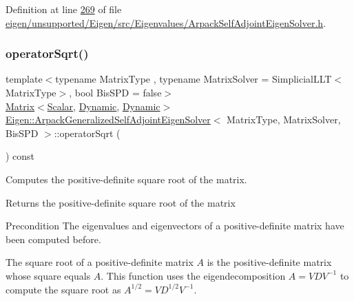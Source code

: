 Definition at line \hyperlink{eigen_2unsupported_2_eigen_2src_2_eigenvalues_2_arpack_self_adjoint_eigen_solver_8h_source_l00269}{269} of file \hyperlink{eigen_2unsupported_2_eigen_2src_2_eigenvalues_2_arpack_self_adjoint_eigen_solver_8h_source}{eigen/unsupported/\+Eigen/src/\+Eigenvalues/\+Arpack\+Self\+Adjoint\+Eigen\+Solver.\+h}.

\mbox{\label{class_eigen_1_1_arpack_generalized_self_adjoint_eigen_solver_a7522aad061ebccc065b254c0bc67d3b0}} 
\subsubsection{\texorpdfstring{operator\+Sqrt()}{operatorSqrt()}\hspace{0.1cm}{\footnotesize\ttfamily [2/2]}}
{\footnotesize\ttfamily template$<$typename Matrix\+Type , typename Matrix\+Solver  = Simplicial\+L\+L\+T$<$\+Matrix\+Type$>$, bool Bis\+S\+PD = false$>$ \\
\hyperlink{group___core___module_class_eigen_1_1_matrix}{Matrix}$<$\hyperlink{class_eigen_1_1_arpack_generalized_self_adjoint_eigen_solver_ab1182405bfe87a505d4b7a8311c661ec}{Scalar}, \hyperlink{namespace_eigen_ad81fa7195215a0ce30017dfac309f0b2}{Dynamic}, \hyperlink{namespace_eigen_ad81fa7195215a0ce30017dfac309f0b2}{Dynamic}$>$ \hyperlink{class_eigen_1_1_arpack_generalized_self_adjoint_eigen_solver}{Eigen\+::\+Arpack\+Generalized\+Self\+Adjoint\+Eigen\+Solver}$<$ Matrix\+Type, Matrix\+Solver, Bis\+S\+PD $>$\+::operator\+Sqrt (\begin{DoxyParamCaption}{ }\end{DoxyParamCaption}) const\hspace{0.3cm}{\ttfamily [inline]}}



Computes the positive-\/definite square root of the matrix. 

\begin{DoxyReturn}{Returns}
the positive-\/definite square root of the matrix
\end{DoxyReturn}
\begin{DoxyPrecond}{Precondition}
The eigenvalues and eigenvectors of a positive-\/definite matrix have been computed before.
\end{DoxyPrecond}
The square root of a positive-\/definite matrix $ A $ is the positive-\/definite matrix whose square equals $ A $. This function uses the eigendecomposition $ A = V D V^{-1} $ to compute the square root as $ A^{1/2} = V D^{1/2} V^{-1} $.

